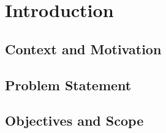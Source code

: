 \chapter{Introduction}

\section{Context and Motivation}

\section{Problem Statement}

\section{Objectives and Scope}
